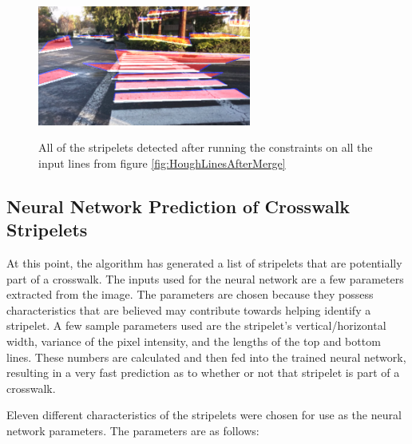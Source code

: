 \documentclass[12pt]{ucthesis}
\newcommand{\captionfonts}{\small\bf\ssp}
\begin{document}
\begin{figure}[t]
\begin{center}
\includegraphics[width=7cm]{UnculledStripelets.png}
\captionfonts
\caption[All detected stripelets]{All of the stripelets detected after running the constraints on all the input lines from figure \ref{fig:HoughLinesAfterMerge}}
\label{fig:UnculledStripelets}
\end{center}
\end{figure}

\subsection{Neural Network Prediction of Crosswalk Stripelets}


At this point, the algorithm has generated a list of stripelets that are potentially part of a crosswalk. The inputs used for the neural network are a few parameters extracted from the image. The parameters are chosen because they possess characteristics that are believed may contribute towards helping identify a stripelet. A few sample parameters used are the stripelet's vertical/horizontal width, variance of the pixel intensity, and the lengths of the top and bottom lines. These numbers are calculated and then fed into the trained neural network, resulting in a very fast prediction as to whether or not that stripelet is part of a crosswalk.


Eleven different characteristics of the stripelets were chosen for use as the neural network parameters. The parameters are as follows:
\end{document}

